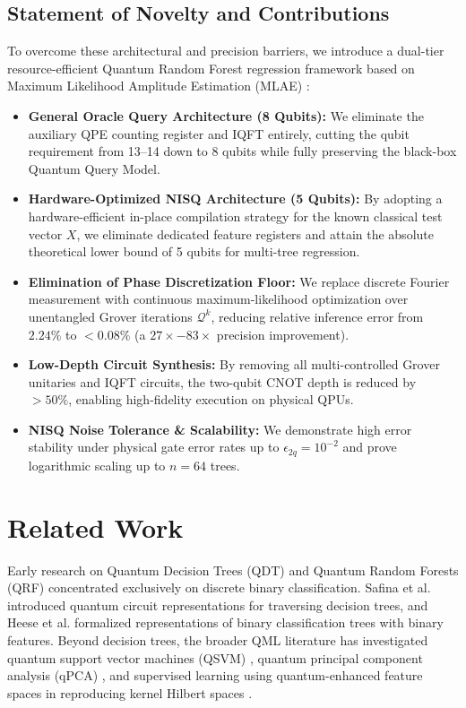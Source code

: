 \documentclass[conference]{IEEEtran}
\begin{document}
\subsection{Statement of Novelty and Contributions}\label{subsec1.2}

To overcome these architectural and precision barriers, we introduce a dual-tier resource-efficient Quantum Random Forest regression framework based on Maximum Likelihood Amplitude Estimation (MLAE) \cite{suzuki2020amplitude}:
\begin{itemize}
    \item \textbf{General Oracle Query Architecture (8 Qubits):} We eliminate the auxiliary QPE counting register and IQFT entirely, cutting the qubit requirement from 13--14 down to 8 qubits while fully preserving the black-box Quantum Query Model.
    \item \textbf{Hardware-Optimized NISQ Architecture (5 Qubits):} By adopting a hardware-efficient in-place compilation strategy \cite{kandala2017hardware} for the known classical test vector $X$, we eliminate dedicated feature registers and attain the absolute theoretical lower bound of 5 qubits for multi-tree regression.
    \item \textbf{Elimination of Phase Discretization Floor:} We replace discrete Fourier measurement with continuous maximum-likelihood optimization over unentangled Grover iterations $\mathcal{Q}^k$, reducing relative inference error from $2.24\%$ to $< 0.08\%$ (a $27\times - 83\times$ precision improvement).
    \item \textbf{Low-Depth Circuit Synthesis:} By removing all multi-controlled Grover unitaries and IQFT circuits, the two-qubit CNOT depth is reduced by $> 50\%$, enabling high-fidelity execution on physical QPUs.
    \item \textbf{NISQ Noise Tolerance \& Scalability:} We demonstrate high error stability under physical gate error rates up to $\epsilon_{2q} = 10^{-2}$ and prove logarithmic scaling up to $n=64$ trees.
\end{itemize}

\section{Related Work}\label{sec2}

Early research on Quantum Decision Trees (QDT) and Quantum Random Forests (QRF) concentrated exclusively on discrete binary classification. Safina et al. \cite{safina2023quantum} introduced quantum circuit representations for traversing decision trees, and Heese et al. \cite{heese2022representation} formalized representations of binary classification trees with binary features. Beyond decision trees, the broader QML literature has investigated quantum support vector machines (QSVM) \cite{rebentrost2014quantum}, quantum principal component analysis (qPCA) \cite{lloyd2014quantum}, and supervised learning using quantum-enhanced feature spaces in reproducing kernel Hilbert spaces \cite{schuld2019quantum,havlicek2019supervised}.
\end{document}
